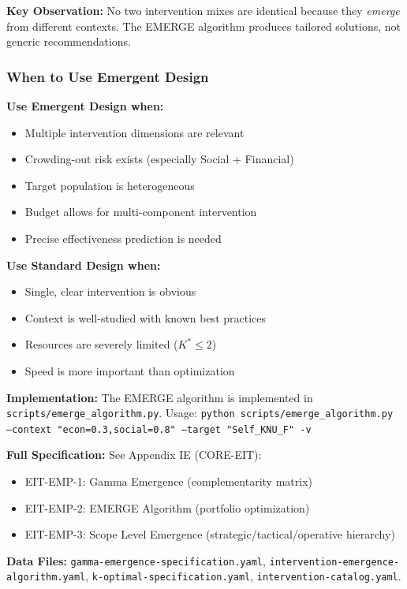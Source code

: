 \textbf{Key Observation:} No two intervention mixes are identical because they \emph{emerge} from different contexts. The EMERGE algorithm produces tailored solutions, not generic recommendations.

\subsubsection{When to Use Emergent Design}
\label{subsubsec:when-to-use}

\begin{tcolorbox}[colback=yellow!5!white, colframe=yellow!75!black,
    title=\textbf{Decision Framework: Emergent vs. Standard Design}]

\textbf{Use Emergent Design when:}
\begin{itemize}[nosep]
    \item Multiple intervention dimensions are relevant
    \item Crowding-out risk exists (especially Social + Financial)
    \item Target population is heterogeneous
    \item Budget allows for multi-component intervention
    \item Precise effectiveness prediction is needed
\end{itemize}

\textbf{Use Standard Design when:}
\begin{itemize}[nosep]
    \item Single, clear intervention is obvious
    \item Context is well-studied with known best practices
    \item Resources are severely limited ($K^* \leq 2$)
    \item Speed is more important than optimization
\end{itemize}

\end{tcolorbox}

\begin{cross-reference}
\textbf{Implementation:} The EMERGE algorithm is implemented in \texttt{scripts/emerge\_algorithm.py}. Usage: \texttt{python scripts/emerge\_algorithm.py --context "econ=0.3,social=0.8" --target "Self\_KNU\_F" -v}

\textbf{Full Specification:} See Appendix IE (CORE-EIT):
\begin{itemize}[nosep]
    \item EIT-EMP-1: Gamma Emergence (complementarity matrix)
    \item EIT-EMP-2: EMERGE Algorithm (portfolio optimization)
    \item EIT-EMP-3: Scope Level Emergence (strategic/tactical/operative hierarchy)
\end{itemize}

\textbf{Data Files:} \texttt{gamma-emergence-specification.yaml}, \texttt{intervention-emergence-algorithm.yaml}, \texttt{k-optimal-specification.yaml}, \texttt{intervention-catalog.yaml}.
\end{cross-reference}

